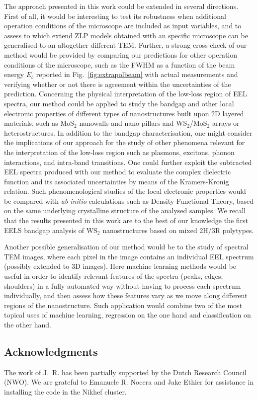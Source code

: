The approach presented in this work could be extended
in several directions.
%
First of all, it would be interesting to test its robustness when additional
operation conditions of the microscope are included as input variables,
and to assess to which extend ZLP models obtained with an specific microscope
can be generalised to an altogether different TEM.
%
Further, a strong cross-check of our method would be provided by comparing
our predictions for other operation conditions of the microscope, such
as the FWHM as a function of the beam energy $E_b$ reported in Fig.~\ref{fig:extrapolbeam}
with actual measurements and verifying whether or not there is agreement within the
uncertainties of the prediction.
%
Concerning the physical interpretation of the low-loss region of EEL
spectra, our method could be applied to study the bandgap
and other local electronic properties of different types
of nanostructures built upon 2D layered materials, such as MoS$_2$ nanowalls
and nano-pillars and WS$_2$/MoS$_2$ arrays or heterostructures.
%
In addition to the bandgap characterisation, one might
consider the implications of our approach for the study
of other phenomena relevant for the interpretation of the low-loss
region such as  plasmons, excitons, phonon interactions, and
intra-band transitions.
%
One could   further exploit the subtracted EEL spectra produced
with our method to evaluate the complex dielectric function and its associated
uncertainties by means of the Kramers-Kronig relation.
%
Such phenomenological studies of the local electronic properties would be compared
with {\it ab initio} calculations such as Density Functional Theory, based
on the same underlying crystalline structure of the analysed samples.
%
We recall that the results
presented in this work are to the best of our knowledge the first EELS bandgap
analysis of WS$_2$ nanostructures based on mixed 2H/3R polytypes.

Another possible generalisation of our method would be to the study of spectral TEM images,
where each pixel in the image contains an individual EEL spectrum (possibly
extended to 3D images).
%
Here machine learning methods would be useful in order
to  identify relevant features of the spectra (peaks, edges, shoulders) in a fully
automated way
without having to process each spectrum individually, and then assess
how these features vary as we move along different regions of the
nanostructure.
%
Such application would combine two of the most topical uses of machine learning, regression
on the one hand and classification on the other hand.

\subsection*{Acknowledgments}
%
The work of J.~R. has been partially supported by the
Dutch Research Council (NWO).
%
We are grateful to Emanuele R. Nocera and Jake Ethier for
assistance in installing the code in the Nikhef cluster.
